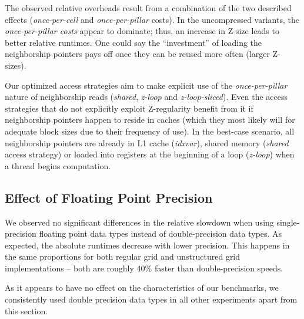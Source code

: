 The observed relative overheads result from a combination of the two described effects (\emph{once-per-cell} and \emph{once-per-pillar} costs). In the uncompressed variants, the \emph{once-per-pillar costs} appear to dominate; thus, an increase in Z-size leads to better relative runtimes. One could say the ``investment'' of loading the neighborship pointers pays off once they can be reused more often (larger Z-sizes).

Our optimized access strategies aim to make explicit use of the \emph{once-per-pillar} nature of neighborship reads (\emph{shared}, \emph{z-loop} and \emph{z-loop-sliced}). Even the access strategies that do not explicitly exploit Z-regularity benefit from it if neighborship pointers happen to reside in caches (which they most likely will for adequate block sizes due to their frequency of use).  In the best-case scenario, all neighborship pointers are already in L1 cache (\emph{idxvar}), shared memory (\emph{shared} access strategy) or loaded into registers at the beginning of a loop (\emph{z-loop}) when a thread begins computation.

\subsection{Effect of Floating Point Precision}

We observed no significant differences in the relative slowdown when using single-precision floating point data types instead of double-precision data types. As expected, the absolute runtimes decrease with lower precision. This happens in the same proportions for both regular grid and unstructured grid implementations -- both are roughly $40\%$ faster than double-precision speeds.

As it appears to have no effect on the characteristics of our benchmarks, we consistently used double precision data types in all other experiments apart from this section.